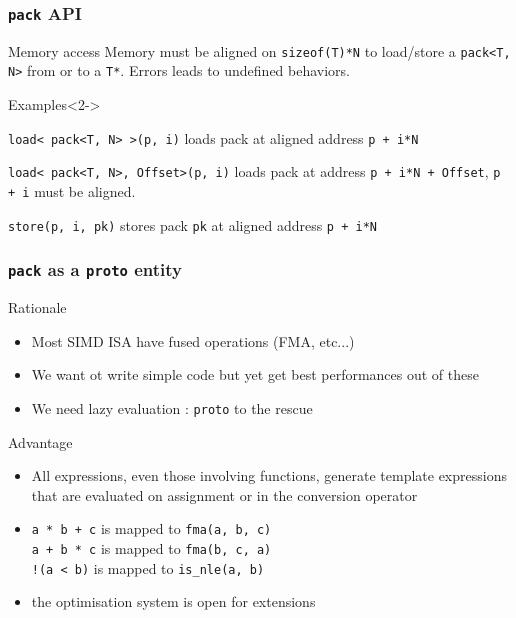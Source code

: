 \frame
{
  \frametitle{\texttt{pack} API}
	
	\begin{block}{Memory access}
\footnotesize
 Memory must be aligned on \lstinline{sizeof(T)*N} to load/store a \lstinline{pack<T, N>}
	from or to a \lstinline{T*}. Errors leads to undefined behaviors.
\end{block}{}

\begin{block}{Examples}<2->
{
\footnotesize
\lstinline{load< pack<T, N> >(p, i)} loads pack at aligned address \lstinline{p + i*N}
\begin{center}\end{center}
}

{
\footnotesize
\lstinline{load< pack<T, N>, Offset>(p, i)} loads pack at address \lstinline{p + i*N + Offset}, \lstinline{p + i} must be aligned.
\begin{center}\end{center}
}

{
\footnotesize
  \lstinline{store(p, i, pk)} stores pack \lstinline{pk} at aligned address \lstinline{p + i*N}
}
\end{block}{}
}

\frame
{
  \frametitle{\texttt{pack} as a \texttt{proto} entity}
	
	\begin{block}{Rationale}
	\begin{itemize}\footnotesize
       \item Most SIMD ISA have fused operations (FMA, etc...)
     \item We want ot write simple code but yet get best performances out of these
  \item We need lazy evaluation : \texttt{proto} to the rescue
        \end{itemize}
	\end{block}{}
	
	\begin{block}{Advantage}
	\begin{itemize}\footnotesize
		\item All expressions, even those involving functions,
		      generate template expressions that are evaluated on assignment
		      or in the conversion operator
		\item \lstinline{a * b + c} is mapped to \lstinline{fma(a, b, c)}\\
		      \lstinline{a + b * c} is mapped to \lstinline{fma(b, c, a)}\\
		      \lstinline{!(a < b)} is mapped to \lstinline{is_nle(a, b)}
   \item the optimisation system is open for extensions
	\end{itemize}
	\end{block}{}
}

